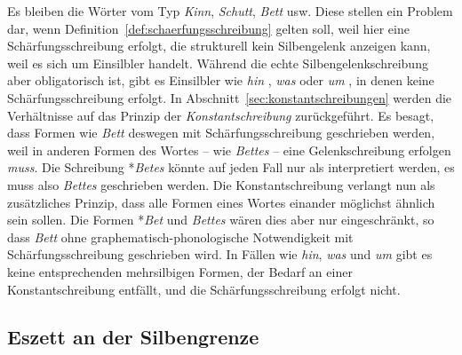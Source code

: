 
Es bleiben die Wörter vom Typ \textit{Kinn}, \textit{Schutt}, \textit{Bett} usw.
Diese stellen ein Problem dar, wenn Definition~\ref{def:schaerfungsschreibung} gelten soll, weil hier eine Schärfungsschreibung erfolgt, die strukturell kein Silbengelenk anzeigen kann, weil es sich um Einsilbler handelt.
Während die echte Silbengelenkschreibung aber obligatorisch ist, gibt es Einsilbler wie \textit{hin} \textipa{[hIn]}, \textit{was} \textipa{[vas]} oder \textit{um} \textipa{[PUm]}, in denen keine Schärfungsschreibung erfolgt.
In Abschnitt~\ref{sec:konstantschreibungen} werden die Verhältnisse auf das Prinzip der \textit{Konstantschreibung} zurückgeführt.
Es besagt, dass Formen wie \textit{Bett} deswegen mit Schärfungsschreibung geschrieben werden, weil in anderen Formen des Wortes -- wie \zB \textit{Bettes} -- eine Gelenkschreibung erfolgen \textit{muss}.
Die Schreibung *\textit{Betes} könnte auf jeden Fall nur als \textipa{[be:t@s]} interpretiert werden, es muss also \textit{Bettes} geschrieben werden.
Die Konstantschreibung verlangt nun als zusätzliches Prinzip, dass alle Formen eines Wortes einander möglichst ähnlich sein sollen.
Die Formen *\textit{Bet} und \textit{Bettes} wären dies aber nur eingeschränkt, so dass \textit{Bett} ohne graphematisch-phonologische Notwendigkeit mit Schärfungsschreibung geschrieben wird.
In Fällen wie \textit{hin}, \textit{was} und \textit{um} gibt es keine entsprechenden mehrsilbigen Formen, der Bedarf an einer Konstantschreibung entfällt, und die Schärfungsschreibung erfolgt nicht.

\subsection{Eszett an der Silbengrenze}
\label{sec:eszettandersilbengrenze}

